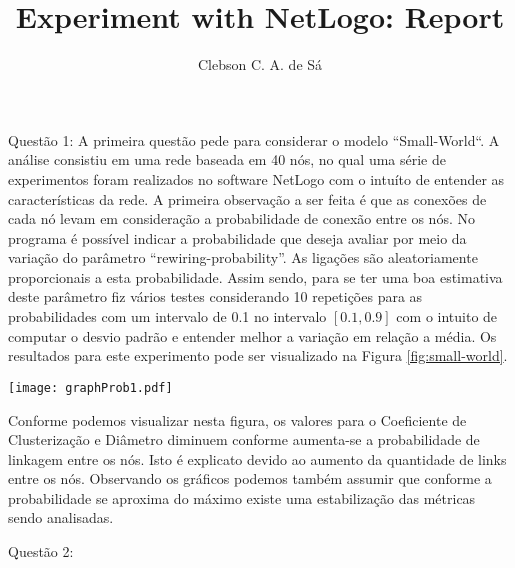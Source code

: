 \documentclass[12pt, letterpaper]{article}
\title{Experiment with NetLogo: Report}
\author{Clebson C. A. de Sá}
\begin{document}
\maketitle

Questão 1: A primeira questão pede para considerar o modelo ``Small-World``.
A análise consistiu em uma rede baseada em 40 nós, no qual uma série de experimentos
foram realizados no software NetLogo com o intuíto de entender as características 
da rede.
A primeira observação a ser feita é que as conexões de cada nó levam em 
consideração a probabilidade de conexão entre os nós. No programa é possível
indicar a probabilidade que deseja avaliar por meio da variação do 
parâmetro ``rewiring-probability''.
As ligações são aleatoriamente proporcionais a esta probabilidade. Assim sendo,
para se ter uma boa estimativa deste parâmetro fiz vários testes considerando 
10 repetições para as probabilidades com um intervalo de 0.1 no intervalo
$\left[0.1, 0.9\right]$ com o intuito de computar o desvio padrão e entender melhor
a variação em relação a média. 
Os resultados para este experimento pode ser visualizado
na Figura \ref{fig:small-world}.

\begin{figure*}[h]
  \centering
  \texttt{[image: graphProb1.pdf]}
  \caption{Coeficiente de Clusterização e Diâmetro com variação da probabilidade.}
  \label{fig:small-world}
\end{figure*}


Conforme podemos visualizar nesta figura, os valores para o Coeficiente de Clusterização
e Diâmetro diminuem conforme aumenta-se a probabilidade de linkagem entre os nós.
Isto é explicato devido ao aumento da quantidade de links  entre os nós.
Observando os gráficos podemos também assumir que conforme a probabilidade se aproxima
do máximo existe uma estabilização das métricas sendo analisadas.


Questão 2:
\end{document}
